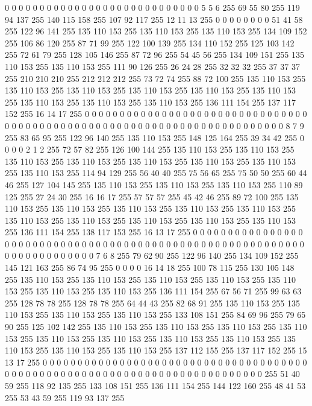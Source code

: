 0 0 0 0 0 0 0 0 0 0 0 0 0 0 0 0 0 0 0 0 0 0 0 0 0 0 0 0 5 5 6 255 69 55 80 255 119 94 137 255 140 115 158 255 107 92 117 255 12 11 13 255 0 0 0 0 0 0 0 0 51 41 58 255
122 96 141 255 135 110 153 255 135 110 153 255 135 110 153 255 134 109 152 255 106 86 120 255 87 71 99 255 122 100 139 255 134 110 152 255 125 103 142 255 72 61 79 255 128 105 146 255 87 72 96 255 54 45 56 255 134 109 151 255 135 110 153 255
135 110 153 255 111 90 126 255 26 24 28 255 32 32 32 255 37 37 37 255 210 210 210 255 212 212 212 255 73 72 74 255 88 72 100 255 135 110 153 255 135 110 153 255 135 110 153 255 135 110 153 255 135 110 153 255 135 110 153 255 135 110 153 255
135 110 153 255 135 110 153 255 136 111 154 255 137 117 152 255 16 14 17 255 0 0 0 0 0 0 0 0 0 0 0 0 0 0 0 0 0 0 0 0 0 0 0 0 0 0 0 0 0 0 0 0 0 0 0 0 0 0 0 0 0 0 0 0
0 0 0 0 0 0 0 0 0 0 0 0 0 0 0 0 0 0 0 0 0 0 0 0 0 0 0 0 8 7 9 255 83 65 95 255 122 96 140 255 135 110 153 255 148 125 164 255 39 34 42 255 0 0 0 0 2 1 2 255 72 57 82 255
126 100 144 255 135 110 153 255 135 110 153 255 135 110 153 255 135 110 153 255 135 110 153 255 135 110 153 255 135 110 153 255 135 110 153 255 114 94 129 255 56 40 40 255 75 56 65 255 75 50 50 255 60 44 46 255 127 104 145 255 135 110 153 255
135 110 153 255 135 110 153 255 110 89 125 255 27 24 30 255 16 16 17 255 57 57 57 255 45 42 46 255 89 72 100 255 135 110 153 255 135 110 153 255 135 110 153 255 135 110 153 255 135 110 153 255 135 110 153 255 135 110 153 255 135 110 153 255
135 110 153 255 135 110 153 255 136 111 154 255 138 117 153 255 16 13 17 255 0 0 0 0 0 0 0 0 0 0 0 0 0 0 0 0 0 0 0 0 0 0 0 0 0 0 0 0 0 0 0 0 0 0 0 0 0 0 0 0 0 0 0 0
0 0 0 0 0 0 0 0 0 0 0 0 0 0 0 0 0 0 0 0 0 0 0 0 0 0 0 0 7 6 8 255 79 62 90 255 122 96 140 255 134 109 152 255 145 121 163 255 86 74 95 255 0 0 0 0 16 14 18 255 100 78 115 255
130 105 148 255 135 110 153 255 135 110 153 255 135 110 153 255 135 110 153 255 135 110 153 255 135 110 153 255 135 110 153 255 136 111 154 255 67 56 71 255 99 63 63 255 128 78 78 255 128 78 78 255 64 44 43 255 82 68 91 255 135 110 153 255
135 110 153 255 135 110 153 255 135 110 153 255 133 108 151 255 84 69 96 255 79 65 90 255 125 102 142 255 135 110 153 255 135 110 153 255 135 110 153 255 135 110 153 255 135 110 153 255 135 110 153 255 135 110 153 255 135 110 153 255 135 110 153 255
135 110 153 255 135 110 153 255 137 112 155 255 137 117 152 255 15 13 17 255 0 0 0 0 0 0 0 0 0 0 0 0 0 0 0 0 0 0 0 0 0 0 0 0 0 0 0 0 0 0 0 0 0 0 0 0 0 0 0 0 0 0 0 0
0 0 0 0 0 0 0 0 0 0 0 0 0 0 0 0 0 0 0 0 0 0 0 0 0 0 0 0 0 0 0 255 51 40 59 255 118 92 135 255 133 108 151 255 136 111 154 255 144 122 160 255 48 41 53 255 53 43 59 255 119 93 137 255
